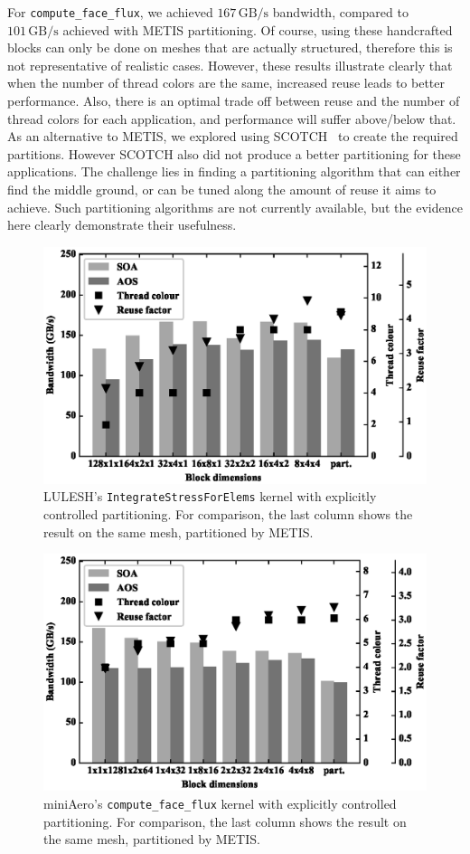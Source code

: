 For \texttt{compute\_face\_flux}, we achieved $167\,\text{GB/s}$ bandwidth,
compared to $101\,\text{GB/s}$ achieved with METIS partitioning. Of course, 
using these handcrafted blocks can only be done on meshes that are actually 
structured, therefore this is not representative of realistic cases. However, 
these results illustrate clearly that when the number of thread colors are the 
same, increased reuse leads to better performance. Also, there is an optimal 
trade off between reuse and the number of thread colors for each application, 
and performance will suffer above/below that. As an alternative to METIS, we 
explored using SCOTCH~\cite{Pellegrini1996} to create the required partitions. 
However SCOTCH also did not produce a better partitioning for these 
applications. The challenge lies in finding a partitioning algorithm that can 
either find the middle ground, or can be tuned  along the amount of reuse it 
aims to achieve. Such partitioning algorithms are not currently available, but 
the evidence here clearly demonstrate their usefulness. 


\begin{figure}[Htbp]
\centering
\includegraphics[width=12cm]{fig/lulesh_block.eps}
\caption{LULESH's \texttt{IntegrateStressForElems} kernel with explicitly 
controlled partitioning. For comparison, the last column shows the result on 
the same mesh, partitioned by METIS.} \label{fig:lulesh_block}
\end{figure}

\begin{figure}[Htbp]
\centering
\includegraphics[width=12cm]{fig/mini_aero_block.eps}
\caption{miniAero's \texttt{compute\_face\_flux} kernel with explicitly 
controlled partitioning. For comparison, the last column shows the result on 
the same mesh, partitioned by METIS.} \label{fig:mini_aero_block}
\end{figure}
